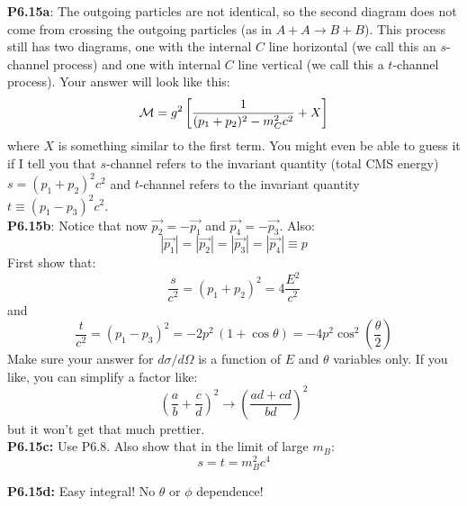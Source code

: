 \documentclass[12pt]{article}
\begin{document}
\noindent
{\bf P6.15a}: The outgoing particles are not identical, so the second diagram does not come from crossing the outgoing particles (as in $A+A \to B+B$).  This process still has two diagrams, one with the internal $C$ line horizontal (we call this an $s$-channel process) and one with internal $C$ line vertical (we call this a $t$-channel process).  Your answer will look like this:
$${\cal M} = g^2 \left[\frac{1}{(p_1+p_2)^2-m_C^2c^2} + X \right]$$
where $X$ is something similar to the first term.  You might even be able to guess it if I tell you that $s$-channel refers to the invariant quantity (total CMS energy) $s=(p_1+p_2)^2c^2$ and $t$-channel refers to the invariant quantity $t\equiv(p_1-p_3)^2c^2$.\\[5pt]

\noindent
{\bf P6.15b}: Notice that now $\vec{p_2}=-\vec{p_1}$ and $\vec{p_4}=-\vec{p_3}$.  Also:
$$|\vec{p_1}| = |\vec{p_2}| = |\vec{p_3}| = |\vec{p_4}| \equiv p$$  First show that:
$$\frac{s}{c^2} = (p_1+p_2)^2 = 4 \frac{E^2}{c^2}$$
and
$$\frac{t}{c^2} = (p_1-p_3)^2 = -2 p^2 \, (1 + \cos\theta) = -4 p^2 \cos^2\left( \frac{\theta}{2}\right)$$
Make sure your answer for $d\sigma/d\Omega$ is a function of $E$ and $\theta$ variables only.  If you like, you can simplify a factor like:
$$\left( \frac{a}{b} + \frac{c}{d}\right)^2 \to \left(\frac{ad+cd}{bd}\right)^2$$
but it won't get that much prettier.\\[5pt]

\noindent
{\bf P6.15c:} Use P6.8.  Also show that in the limit of large $m_B$:
$$s = t = m_B^2 c^4$$

\noindent
{\bf P6.15d:} Easy integral!  No $\theta$ or $\phi$ dependence!
\end{document}
